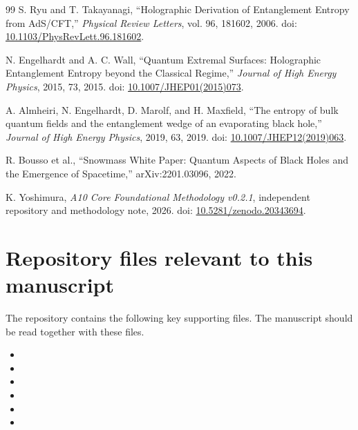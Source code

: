 \documentclass[11pt,a4paper]{article}
\begin{document}
\begin{thebibliography}{99}
S. Ryu and T. Takayanagi, ``Holographic Derivation of Entanglement Entropy from AdS/CFT,'' \emph{Physical Review Letters}, vol. 96, 181602, 2006. doi: \href{https://doi.org/10.1103/PhysRevLett.96.181602}{10.1103/PhysRevLett.96.181602}.

N. Engelhardt and A. C. Wall, ``Quantum Extremal Surfaces: Holographic Entanglement Entropy beyond the Classical Regime,'' \emph{Journal of High Energy Physics}, 2015, 73, 2015. doi: \href{https://doi.org/10.1007/JHEP01(2015)073}{10.1007/JHEP01(2015)073}.

A. Almheiri, N. Engelhardt, D. Marolf, and H. Maxfield, ``The entropy of bulk quantum fields and the entanglement wedge of an evaporating black hole,'' \emph{Journal of High Energy Physics}, 2019, 63, 2019. doi: \href{https://doi.org/10.1007/JHEP12(2019)063}{10.1007/JHEP12(2019)063}.

R. Bousso et al., ``Snowmass White Paper: Quantum Aspects of Black Holes and the Emergence of Spacetime,'' arXiv:2201.03096, 2022.

K. Yoshimura, \emph{A10 Core Foundational Methodology v0.2.1}, independent repository and methodology note, 2026. doi: \href{https://doi.org/10.5281/zenodo.20343694}{10.5281/zenodo.20343694}.

\end{thebibliography}

\appendix
\section{Repository files relevant to this manuscript}

The repository contains the following key supporting files. The manuscript should be read together with these files.

\begin{itemize}
  \item {}
  \item {}
  \item {}
  \item {}
  \item {}
  \item {}
\end{itemize}
\end{document}
